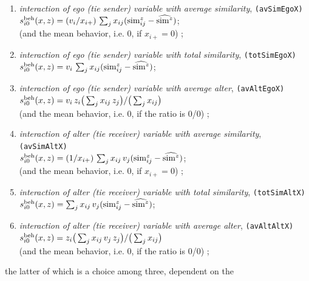 \documentclass[a4paper,fleqn,11pt]{article}
\newcommand{\+}{\, + \,}
\newcommand{\vit}{\theenumi}
\newcounter{savenumi}
\begin{document}
\begin{enumerate}
\setcounter{enumi}{\value{savenumi}}
\item {\em interaction of ego (tie sender) variable with average similarity},
                       \texttt{(avSimEgoX)} \\
 $s^{\rm beh}_{i\vit}(x, z) = (v_i / x_{i+}) \,
         \sum_j x_{ij} ({\rm sim}^z_{ij} - \widehat{{\rm sim}^z}) $;\\
 (and the mean behavior, i.e. $0$, if $x_{i+} = 0$) ;
\item {\em interaction of ego (tie sender) variable with total similarity},
                       \texttt{(totSimEgoX)} \\
 $s^{\rm beh}_{i\vit}(x, z) = v_i \,
         \sum_j x_{ij} ({\rm sim}^z_{ij} - \widehat{{\rm sim}^z}) $;
\item {\em interaction of ego (tie sender) variable with average alter},
                       \texttt{(avAltEgoX)} \\
 $s^{\rm beh}_{i\vit}(x, z) =  v_i \, z_i \big( \sum_j x_{ij}\, z_j \big)
                                / \big (\sum_j x_{ij}\big)  $\\
 (and the mean behavior, i.e. $0$, if the ratio is 0/0) ;
\item {\em interaction of alter (tie receiver) variable with average similarity},
                       \texttt{(avSimAltX)} \\
 $s^{\rm beh}_{i\vit}(x, z) = (1 / x_{i+}) \,
         \sum_j x_{ij} \, v_j ({\rm sim}^z_{ij} - \widehat{{\rm sim}^z}) $;\\
 (and the mean behavior, i.e. $0$, if $x_{i+} = 0$) ;
\item {\em interaction of alter (tie receiver) variable with total similarity},
                       \texttt{(totSimAltX)} \\
 $s^{\rm beh}_{i\vit}(x, z) =
         \sum_j x_{ij} \, v_j ({\rm sim}^z_{ij} - \widehat{{\rm sim}^z}) $;
\item {\em interaction of alter (tie receiver) variable with average alter},
                       \texttt{(avAltAltX)} \\
 $s^{\rm beh}_{i\vit}(x, z) =  z_i \big( \sum_j x_{ij} \, v_j \, z_j \big)
                                / \big (\sum_j x_{ij}\big)  $\\
 (and the mean behavior, i.e. $0$, if the ratio is 0/0) ;
\setcounter{savenumi}{\value{enumi}}
\end{enumerate}
\iffalse
the latter of which is a choice among three, dependent on the
\end{document}
